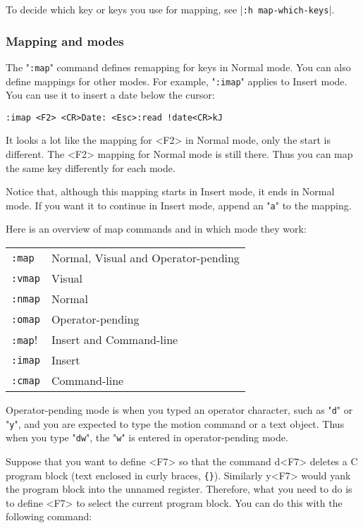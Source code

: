 To decide which key or keys you use for mapping, see |\verb!:h map-which-keys!|.

\subsubsection{Mapping and modes}
The "\verb!:map!" command defines remapping for keys in Normal mode.
You can also define mappings for other modes.
For example, "\verb!:imap!" applies to Insert mode.
You can use it to insert a date below the cursor:

\begin{Verbatim}[samepage=true]
 :imap <F2> <CR>Date: <Esc>:read !date<CR>kJ
\end{Verbatim}

It looks a lot like the mapping for <F2> in Normal mode, only the start is different.
The <F2> mapping for Normal mode is still there.
Thus you can map the same key differently for each mode.

Notice that, although this mapping starts in Insert mode, it ends in Normal mode.
If you want it to continue in Insert mode, append an "\verb!a!" to the mapping.

Here is an overview of map commands and in which mode they work:
\begin{center} \begin{tabular}{l l}
				\verb!:map! & Normal, Visual and Operator-pending \\
				\verb!:vmap! & Visual \\
				\verb!:nmap! & Normal \\
				\verb!:omap! & Operator-pending \\
				\verb!:map!! & Insert and Command-line \\
				\verb!:imap! & Insert \\
				\verb!:cmap! & Command-line \\
\end{tabular} \end{center}

Operator-pending mode is when you typed an operator character, such as "\verb!d!" or "\verb!y!", and you are expected to type the motion command or a text object.
Thus when you type "\verb!dw!", the "\verb!w!" is entered in operator-pending mode.

Suppose that you want to define <F7> so that the command d<F7> deletes a C program block (text enclosed in curly braces, \verb!{}!).
Similarly y<F7> would yank the program block into the unnamed register.
Therefore, what you need to do is to define <F7> to select the current program block.
You can do this with the following command:

